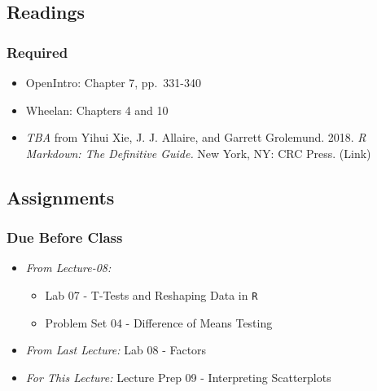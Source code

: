 \documentclass[]{book}
\providecommand{\tightlist}{%
  \setlength{\itemsep}{0pt}\setlength{\parskip}{0pt}}
\theoremstyle{definition}
\theoremstyle{definition}
\theoremstyle{definition}
\theoremstyle{remark}
\begin{document}
\hypertarget{readings-11}{%
\subsection*{Readings}\label{readings-11}}

\hypertarget{required-11}{%
\subsubsection*{Required}\label{required-11}}

\begin{itemize}
\tightlist
\item
  OpenIntro: Chapter 7, pp.~331-340
\item
  Wheelan: Chapters 4 and 10
\item
  \emph{TBA} from Yihui Xie, J. J. Allaire, and Garrett Grolemund. 2018.
  \emph{R Markdown: The Definitive Guide.} New York, NY: CRC Press.
  (Link)
\end{itemize}

\hypertarget{assignments-11}{%
\subsection*{Assignments}\label{assignments-11}}

\hypertarget{due-before-class-9}{%
\subsubsection*{Due Before Class}\label{due-before-class-9}}

\begin{itemize}
\tightlist
\item
  \emph{From Lecture-08:}

  \begin{itemize}
  \tightlist
  \item
    Lab 07 - T-Tests and Reshaping Data in \texttt{R}
  \item
    Problem Set 04 - Difference of Means Testing
  \end{itemize}
\item
  \emph{From Last Lecture:} Lab 08 - Factors
\item
  \emph{For This Lecture:} Lecture Prep 09 - Interpreting Scatterplots
\end{itemize}
\end{document}
